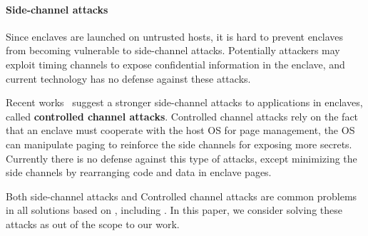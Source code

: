 \paragraph{Side-channel attacks}
Since enclaves are launched on untrusted hosts, it is hard to prevent
enclaves from becoming vulnerable to side-channel attacks.
Potentially attackers may exploit timing channels to expose confidential
information in the enclave, and current \sgx{} technology has no defense
against these attacks.

Recent works~\citep{xu15controlledchannel} suggest a stronger
side-channel attacks to applications in enclaves,
called {\bf controlled channel attacks}.
Controlled channel attacks rely on the fact that an enclave must cooperate
with the host OS for page management,
the OS can manipulate paging to reinforce the side channels
for exposing more secrets.
Currently there is no defense against this type of attacks, except minimizing
the side channels by rearranging code and data in enclave pages.

Both side-channel attacks and Controlled channel attacks
are common problems in all solutions based on \sgx{},
including \haven{}. In this paper, we consider solving these attacks as
out of the scope to our work.


